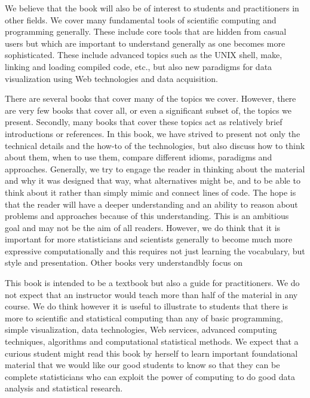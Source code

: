 We believe that the book will also be of interest to students and
practitioners in other fields.  We cover many fundamental tools of
scientific computing and programming generally.  These include core
tools that are hidden from casual users but which are important to
understand generally as one becomes more sophisticated.  These include
advanced topics such as the UNIX shell, make, linking and loading
compiled code, etc., but also new paradigms for data visualization
using Web technologies and data acquisition.

There are several books that cover many of the topics we
cover. However, there are very few books that cover all, or even a
significant subset of, the topics we present. Secondly, many books
that cover these topics act as relatively brief introductions or
references.  In this book, we have strived to present not only the
technical details and the how-to of the technologies, but also discuss
how to think about them, when to use them, compare different idioms,
paradigms and approaches.  Generally, we try to engage the reader in
thinking about the material and why it was designed that way, what
alternatives might be, and to be able to think about it rather than
simply mimic and connect lines of code.  The hope is that the reader
will have a deeper understanding and an ability to reason about
problems and approaches because of this understanding.  This is an
ambitious goal and may not be the aim of all readers.  However, we do
think that it is important for more statisticians and scientists
generally to become much more expressive computationally and this
requires not just learning the vocabulary, but style and presentation.
Other books very understandbly focus on 

This book is intended to be a textbook but also a guide for
practitioners.  We do not expect that an instructor would teach more
than half of the material in any course.  We do think however it is
useful to illustrate to students that there is more to scientific and
statistical computing than any of basic programming, simple
visualization, data technologies, Web services, advanced computing
techniques, algorithms and computational statistical methods.  We
expect that a curious student might read this book by herself to learn
important foundational material that we would like our good students
to know so that they can be complete statisticians who can exploit the
power of computing to do good data analysis and statistical research.





